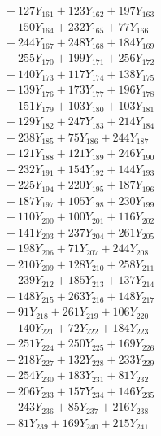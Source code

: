 \documentclass[a4paper,10pt]{article}
\begin{document}
{\begin{align}
&\;  + 127 Y_{161} + 123 Y_{162} + 197 Y_{163} \\[0.3ex]
&\;  + 150 Y_{164} + 232 Y_{165} + 77 Y_{166} \\[0.3ex]
&\;  + 244 Y_{167} + 248 Y_{168} + 184 Y_{169} \\[0.3ex]
&\;  + 255 Y_{170} + 199 Y_{171} + 256 Y_{172} \\[0.3ex]
&\;  + 140 Y_{173} + 117 Y_{174} + 138 Y_{175} \\[0.3ex]
&\;  + 139 Y_{176} + 173 Y_{177} + 196 Y_{178} \\[0.5ex]\allowbreak
&\;  + 151 Y_{179} + 103 Y_{180} + 103 Y_{181} \\[0.3ex]
&\;  + 129 Y_{182} + 247 Y_{183} + 214 Y_{184} \\[0.3ex]
&\;  + 238 Y_{185} + 75 Y_{186} + 244 Y_{187} \\[0.3ex]
&\;  + 121 Y_{188} + 121 Y_{189} + 246 Y_{190} \\[0.3ex]
&\;  + 232 Y_{191} + 154 Y_{192} + 144 Y_{193} \\[0.3ex]
&\;  + 225 Y_{194} + 220 Y_{195} + 187 Y_{196} \\[0.3ex]
&\;  + 187 Y_{197} + 105 Y_{198} + 230 Y_{199} \\[0.3ex]
&\;  + 110 Y_{200} + 100 Y_{201} + 116 Y_{202} \\[0.3ex]
&\;  + 141 Y_{203} + 237 Y_{204} + 261 Y_{205} \\[0.3ex]
&\;  + 198 Y_{206} + 71 Y_{207} + 244 Y_{208} \\[0.5ex]\allowbreak
&\;  + 210 Y_{209} + 128 Y_{210} + 258 Y_{211} \\[0.3ex]
&\;  + 239 Y_{212} + 185 Y_{213} + 137 Y_{214} \\[0.3ex]
&\;  + 148 Y_{215} + 263 Y_{216} + 148 Y_{217} \\[0.3ex]
&\;  + 91 Y_{218} + 261 Y_{219} + 106 Y_{220} \\[0.3ex]
&\;  + 140 Y_{221} + 72 Y_{222} + 184 Y_{223} \\[0.3ex]
&\;  + 251 Y_{224} + 250 Y_{225} + 169 Y_{226} \\[0.3ex]
&\;  + 218 Y_{227} + 132 Y_{228} + 233 Y_{229} \\[0.3ex]
&\;  + 254 Y_{230} + 183 Y_{231} + 81 Y_{232} \\[0.3ex]
&\;  + 206 Y_{233} + 157 Y_{234} + 146 Y_{235} \\[0.3ex]
&\;  + 243 Y_{236} + 85 Y_{237} + 216 Y_{238} \\[0.5ex]\allowbreak
&\;  + 81 Y_{239} + 169 Y_{240} + 215 Y_{241} \\[0.3ex]

\end{align}}
\end{document}
